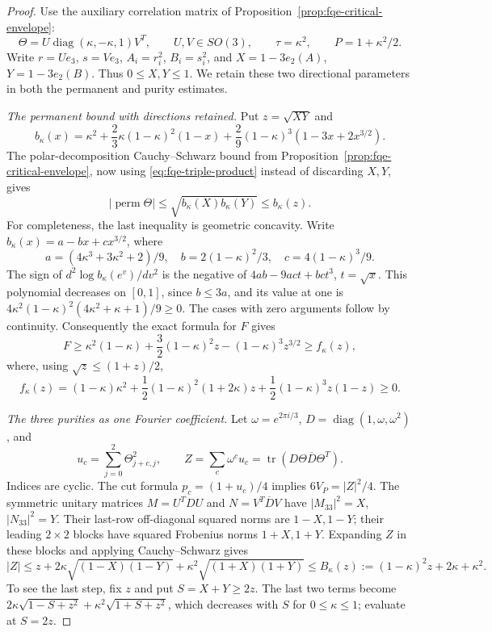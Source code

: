 \begin{proof}
Use the auxiliary correlation matrix of Proposition~\ref{prop:fqe-critical-envelope}:
\[
 \Theta=U\operatorname{diag}(\kappa,-\kappa,1)V^T,\qquad U,V\in SO(3),
 \qquad \tau=\kappa^2,\qquad P=1+\kappa^2/2.
\]
Write $r=Ue_3$, $s=Ve_3$, $A_i=r_i^2$, $B_i=s_i^2$, and
$X=1-3e_2(A)$, $Y=1-3e_2(B)$. Thus $0\le X,Y\le1$.
We retain these two directional parameters in both the permanent and purity estimates.

\emph{The permanent bound with directions retained.}
Put $z=\sqrt{XY}$ and
\[
 b_\kappa(x)=\kappa^2+\frac23\kappa(1-\kappa)^2(1-x)
             +\frac29(1-\kappa)^3(1-3x+2x^{3/2}).
\]
The polar-decomposition Cauchy--Schwarz bound from
Proposition~\ref{prop:fqe-critical-envelope}, now using
\eqref{eq:fqe-triple-product} instead of discarding $X,Y$, gives
\[
 |\operatorname{perm}\Theta|
 \le\sqrt{b_\kappa(X)b_\kappa(Y)}\le b_\kappa(z).
\]
For completeness, the last inequality is geometric concavity.
Write $b_\kappa(x)=a-bx+cx^{3/2}$, where
\[
 a=(4\kappa^3+3\kappa^2+2)/9,\quad
 b=2(1-\kappa)^2/3,\quad c=4(1-\kappa)^3/9.
\]
The sign of $d^2\log b_\kappa(e^v)/dv^2$ is the negative of
$4ab-9ac t+bc t^3$, $t=\sqrt x$.
This polynomial decreases on $[0,1]$, since $b\le3a$, and its value at one is
$4\kappa^2(1-\kappa)^2(4\kappa^2+\kappa+1)/9\ge0$.
The cases with zero arguments follow by continuity.
Consequently the exact formula for $F$ gives
\[
 F\ge\kappa^2(1-\kappa)+\frac32(1-\kappa)^2z
                  -(1-\kappa)^3z^{3/2}
 \ge f_\kappa(z),
\]
where, using $\sqrt z\le(1+z)/2$,
\[
 f_\kappa(z)=(1-\kappa)\kappa^2
       +\frac12(1-\kappa)^2(1+2\kappa)z
       +\frac12(1-\kappa)^3z(1-z)\ge0.
\]

\emph{The three purities as one Fourier coefficient.}
Let $\omega=e^{2\pi i/3}$, $D=\operatorname{diag}(1,\omega,\omega^2)$, and
\[
 u_c=\sum_{j=0}^2\Theta_{j+c,j}^2,\qquad
 Z=\sum_c\omega^c u_c
   =\operatorname{tr}(D\Theta\overline D\Theta^T).
\]
Indices are cyclic. The cut formula $p_c=(1+u_c)/4$ implies
$6V_P=|Z|^2/4$.
The symmetric unitary matrices $M=U^TDU$ and $N=V^T\overline D V$
have $|M_{33}|^2=X$, $|N_{33}|^2=Y$.
Their last-row off-diagonal squared norms are $1-X,1-Y$;
their leading $2\times2$ blocks have squared Frobenius norms $1+X,1+Y$.
Expanding $Z$ in these blocks and applying Cauchy--Schwarz gives
\[
 |Z|\le z+2\kappa\sqrt{(1-X)(1-Y)}
                +\kappa^2\sqrt{(1+X)(1+Y)}
       \le B_\kappa(z):=(1-\kappa)^2z+2\kappa+\kappa^2.
\]
To see the last step, fix $z$ and put $S=X+Y\ge2z$.
The last two terms become
$2\kappa\sqrt{1-S+z^2}+\kappa^2\sqrt{1+S+z^2}$,
which decreases with $S$ for $0\le\kappa\le1$; evaluate at $S=2z$.


\end{proof}
